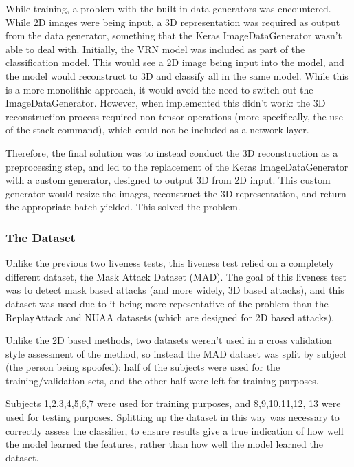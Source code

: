 \documentclass[11pt,a4paper]{article}
\begin{document}
            While training, a problem with the built in data generators was encountered. While 2D images were being input, a 3D representation was required as output from the data generator,
            something that the Keras ImageDataGenerator wasn't able to deal with. Initially, the VRN model was included as part of the classification model. This would see a 2D image being input into the model,
            and the model would reconstruct to 3D and classify all in the same model. While this is a more monolithic approach, it would avoid the need to switch out the ImageDataGenerator. However,
            when implemented this didn't work: the 3D reconstruction process required non-tensor operations (more specifically, the use of the stack command), which could not be included as a network layer.

            Therefore, the final solution was to instead conduct the 3D reconstruction as a preprocessing step, and led to the replacement of the Keras ImageDataGenerator with a custom generator, designed to output 3D from 2D input.
            This custom generator would resize the images, reconstruct the 3D representation, and return the appropriate batch yielded. This solved the problem.

        \subsubsection{The Dataset}
            Unlike the previous two liveness tests, this liveness test relied on a completely different dataset, the Mask Attack Dataset (MAD). \cite{3DMadDataset}
            The goal of this liveness test was to detect mask based attacks (and more widely, 3D based attacks), and this dataset was used due to it being more repesentative of the problem
            than the ReplayAttack and NUAA datasets (which are designed for 2D based attacks).

            Unlike the 2D based methods, two datasets weren't used in a cross validation style assessment of the method, so instead the MAD dataset was split by subject (the person being spoofed):
            half of the subjects were used for the training/validation sets, and the other half were left for training purposes.

            Subjects 1,2,3,4,5,6,7 were used for training purposes, and 8,9,10,11,12, 13 were used for testing purposes. Splitting up the dataset in this way was necessary to correctly assess the classifier,
            to ensure results give a true indication of how well the model learned the features, rather than how well the model learned the dataset.
\end{document}

